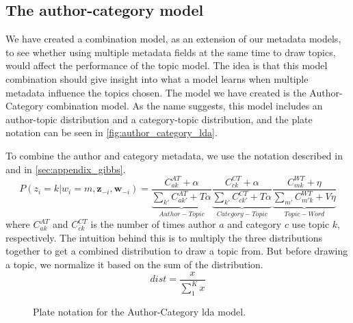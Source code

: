 \subsection{The author-category model}\label{sec:combination}
We have created a combination model, as an extension of our metadata models, to see whether using multiple metadata fields at the same time to draw topics, would affect the performance of the topic model.
The idea is that this model combination should give insight into what a model learns when multiple metadata influence the topics chosen.
The model we have created is the Author-Category combination model.
As the name suggests, this model includes an author-topic distribution and a category-topic distribution, and the plate notation can be seen in \autoref{fig:author_category_lda}.

To combine the author and category metadata, we use the notation described in \citet{author_topic_2012} and in \autoref{sec:appendix_gibbs}.
\begin{equation}
		P(z_i = k |w_i = m, \boldsymbol{z}_{-i}, \boldsymbol{w}_{-i}) = 
	\underbrace{\frac{C^{AT}_{ak} + \alpha}{\sum_{k'} C^{AT}_{ak'} + T\alpha}}_{Author-Topic}
	\underbrace{\frac{C^{CT}_{ck} + \alpha}{\sum_{k'} C^{CT}_{ck'} + T\alpha}}_{Category-Topic}
	\underbrace{\frac{C^{WT}_{mk} + \eta}{\sum_{m'} C^{WT}_{m'k} + V\eta}}_{Topic-Word}
\end{equation}
where $C^{AT}_{ak}$ and $C^{CT}_{ck}$ is the number of times author $a$ and category $c$ use topic $k$, respectively.
The intuition behind this is to multiply the three distributions together to get a combined distribution to draw a topic from.
But before drawing a topic, we normalize it based on the sum of the distribution.
\begin{equation}
	dist = \frac{x}{\sum_{1}^{K} x}
\end{equation}

\begin{figure*}[ht]
	\centering
	\resizebox{.3\textwidth}{!}{%
		
	}
	\caption{Plate notation for the Author-Category \gls{lda} model.}
	\label{fig:author_category_lda}
\end{figure*}




